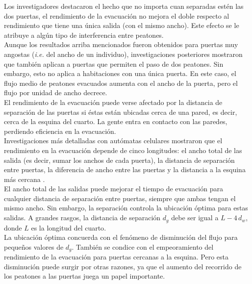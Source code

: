 Los investigadores destacaron el hecho que no importa cuan separadas estén las dos puertas, el rendimiento de la evacuación no mejora el doble respecto al rendimiento que tiene una única salida (con el mismo ancho). Este efecto se le atribuye a algún tipo de interferencia entre peatones\cite{perez1}.\\

Aunque los resultados arriba mencionados fueron obtenidos para puertas muy angostas (\emph{i.e.} del ancho de un individuo), investigaciones posteriores mostraron que también aplican a puertas que permiten el paso de dos peatones. Sin embargo, esto no aplica a habitaciones con una única puerta\cite{daoliang1}. En este caso, el flujo medio de peatones evacuados aumenta con el ancho de la puerta, pero el flujo por unidad de ancho decrece\cite{daoliang1}. \\
 
El rendimiento de la evacuación puede verse afectado por la distancia de separación de las puertas si éstas están ubicadas cerca de una pared, es decir, cerca de la esquina del cuarto. La gente entra en contacto con las paredes, perdiendo eficiencia en la evacuación\cite{kirchner1,daoliang1}. \\

Investigaciones más detalladas con autómatas celulares mostraron que el rendimiento en la evacuación depende de cinco longitudes: el ancho total de las salida (es decir, sumar los anchos de cada puerta), la distancia de separación entre puertas, la diferencia de ancho entre las puertas y la distancia a la esquina más cercana \cite{huanhuan1}. \\

El ancho total de las salidas puede mejorar el tiempo de evacuación para cualquier distancia de separación entre puertas, siempre que ambas tengan el mismo ancho. 
Sin embargo, la separación controla la ubicación óptima para
estas salidas. A grandes rasgos, la distancia de separación $d_g$ debe ser igual a $L-4\,d_w$, donde $L$ es la longitud del cuarto\cite{huanhuan1}. \\

La ubicación óptima concuerda con el fenómeno de disminución del flujo para pequeños valores de $d_g$. También se condice con el empeoramiento del rendimiento de la evacuación para puertas cercanas a la esquina. Pero esta disminución puede surgir por otras razones, ya que el aumento del recorrido de los peatones a las puertas juega un papel importante.\\ 

